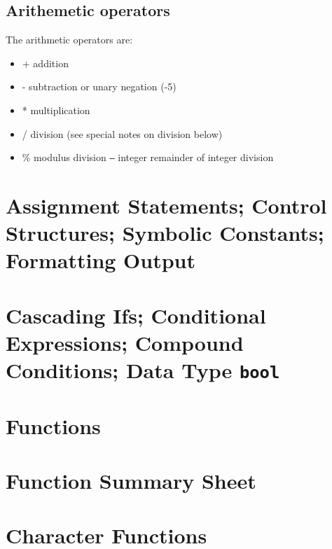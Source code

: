 \documentclass{report}
\begin{document}
        \pagebreak \bigbreak \noindent 
        \subsection{Arithemetic operators}
        \bigbreak \noindent 
        The arithmetic operators are:
        \bigbreak \noindent 
        \begin{itemize}
            \item +  addition
            \item -  subtraction or unary negation (-5)
            \item *  multiplication
            \item /  division (see special notes on division below)
            \item \%  modulus division \texttt{--} integer remainder of integer division
        \end{itemize}
        \bigbreak \noindent 




    \pagebreak \bigbreak \noindent 
    \section{Assignment Statements; Control Structures; Symbolic Constants; Formatting Output}
    \pagebreak \bigbreak \noidennt

    \section{Cascading Ifs; Conditional Expressions; Compound Conditions; Data Type \texttt{bool}}


    \pagebreak \bigbreak \noidennt
    \section{Functions}
    \pagebreak \bigbreak \noidennt

    \section{Function Summary Sheet}
    \pagebreak \bigbreak \noidennt

    \section{Character Functions}
    \pagebreak \bigbreak \noidennt
\end{document}
